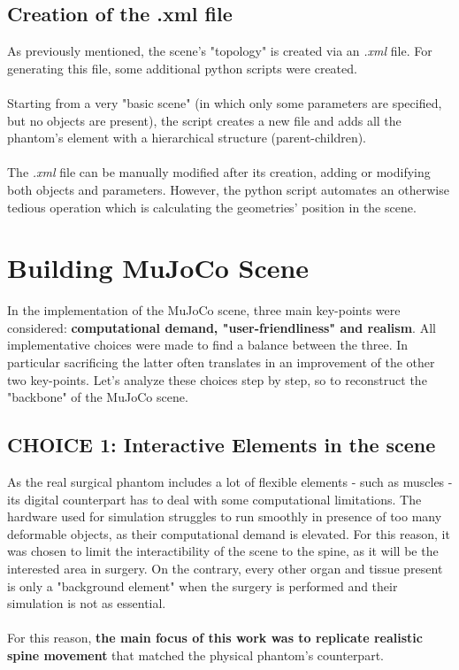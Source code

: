 \documentclass[a4paper, 12pt]{article}
\begin{document}
\subsection{Creation of the .xml file}
As previously mentioned, the scene's "topology" is created via an \textit{.xml} file. For generating this file, some additional python scripts were created.
\\\\Starting from a very "basic scene" (in which only some parameters are specified, but no objects are present), the script creates a new file and adds all the phantom's element with a hierarchical structure (parent-children). 
\\\\The \textit{.xml} file can be manually modified after its creation, adding or modifying both objects and parameters. However, the python script automates an otherwise tedious operation which is calculating the geometries' position in the scene.
\clearpage
\section{Building MuJoCo Scene}
In the implementation of the MuJoCo scene, three main key-points were considered: \textbf{computational demand, "user-friendliness" and realism}. All implementative choices were made to find a balance between the three. In particular sacrificing the latter often translates in an improvement of the other two key-points. Let's analyze these choices step by step,  so to reconstruct the "backbone" of the MuJoCo scene.
\subsection{CHOICE 1: Interactive Elements in the scene}
As the real surgical phantom includes a lot of flexible elements - such as muscles - its digital counterpart has to deal with some computational limitations. The hardware used for simulation struggles to run smoothly in presence of too many deformable objects, as their computational demand is elevated. For this reason, it was chosen to limit the interactibility of the scene to the  spine, as it will be the interested area in surgery. On the contrary, every other organ and tissue present is only a "background element" when the surgery is performed and their simulation is not as essential.
\\\\For this reason, \textbf{the main focus of this work was to replicate realistic spine movement} that matched the physical phantom's counterpart.
\end{document}
